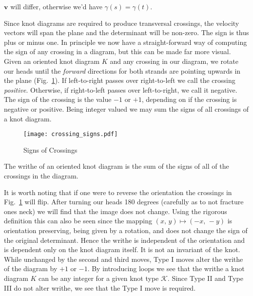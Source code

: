         $\mathbf{v}$ will differ, otherwise we'd have $\gamma(s)=\gamma(t)$.
        \par\hfill\par
        Since knot diagrams are required to produce transversal crossings, the
        velocity vectors will span the plane and the determinant will be
        non-zero. The sign is thus plus or minus one. In principle we now have
        a straight-forward way of computing the sign of any crossing in a
        diagram, but this can be made far more visual.
        Given an oriented knot diagram $K$ and any crossing in our
        diagram, we rotate our heads until the \textit{forward} directions for
        both strands are pointing upwards in the plane
        (Fig.~\ref{fig:crossing_signs}). If left-to-right passes over
        right-to-left we call the crossing \textit{positive}. Otherwise,
        if right-to-left passes over left-to-right, we call it negative.
        The sign of the crossing is the value $-1$ or $+1$, depending on if
        the crossing is negative or positive. Being integer valued we may sum
        the signs of all crossings of a knot diagram.
        \begin{figure}
            \centering
            \texttt{[image: crossing\_signs.pdf]}
            \caption{Signs of Crossings}
            \label{fig:crossing_signs}
        \end{figure}
        \begin{definition}
            The writhe of an oriented knot diagram is the sum of the signs of
            all of the crossings in the diagram.
        \end{definition}
        It is worth noting that if one were to reverse the orientation the
        crossings in Fig.~\ref{fig:crossing_signs} will flip. After turning our
        heads 180 degrees (carefully as to not fracture ones neck) we will
        find that the image does not change. Using the rigorous definition this
        can also be seen since the mapping $(x,\,y)\mapsto(-x,\,-y)$ is
        orientation preserving, being given by a rotation, and does not change
        the sign of the original determinant. Hence the writhe is independent of
        the orientation and is dependent only on the knot diagram itself. It is
        not an invariant of the knot. While unchanged by the second and third
        moves, Type I moves alter the writhe of the diagram by $+1$ or
        $-1$. By introducing loops we see that the writhe a knot diagram $K$
        can be any integer for a given knot type $\mathcal{K}$.
        Since Type II and Type III do not
        alter writhe, we see that the Type I move is required.
